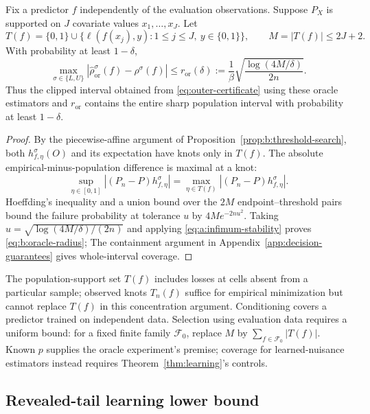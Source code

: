 \begin{proposition}
\label{prop:b:oracle-calibration}
Fix a predictor $f$ independently of the evaluation observations.
Suppose $P_X$ is supported on $J$ covariate values $x_1,\ldots,x_J$.
Let
\[
 T(f)=\{0,1\}\cup\{\ell(f(x_j),y):1\leq j\leq J,
 \ y\in\{0,1\}\},\qquad M=|T(f)|\leq2J+2.
\]
With probability at least $1-\delta$,
\begin{equation}
 \max_{\sigma\in\{L,U\}}
 |\widehat\rho^\sigma_{\mathrm{or}}(f)-\rho^\sigma(f)|
 \leq r_{\mathrm{or}}(\delta):=
 \frac1\beta\sqrt{\frac{\log(4M/\delta)}{2n}}.
 \label{eq:b:oracle-radius}
\end{equation}
Thus the clipped interval obtained from \eqref{eq:outer-certificate}
using these oracle estimators and $r_{\mathrm{or}}$ contains the entire
sharp population interval with probability at least $1-\delta$.
\end{proposition}

\begin{proof}
By the piecewise-affine argument of Proposition~\ref{prop:b:threshold-search},
both $h^\sigma_{f,\eta}(O)$ and its expectation have knots only in $T(f)$.
The absolute empirical-minus-population difference is maximal at a knot:
\[
 \sup_{\eta\in[0,1]}|(P_n-P)h^\sigma_{f,\eta}|
 =\max_{\eta\in T(f)}|(P_n-P)h^\sigma_{f,\eta}|.
\]
Hoeffding's inequality and a union bound over the $2M$ endpoint--threshold
pairs bound the failure probability at tolerance $u$ by $4Me^{-2nu^2}$.
Taking $u=\sqrt{\log(4M/\delta)/(2n)}$ and applying
\eqref{eq:a:infimum-stability} proves \eqref{eq:b:oracle-radius};
The containment argument in Appendix~\ref{app:decision-guarantees} gives
whole-interval coverage.
\end{proof}

The population-support set $T(f)$ includes losses at cells absent from a
particular sample; observed knots $T_n(f)$ suffice for empirical minimization
but cannot replace $T(f)$ in this concentration argument.
Conditioning covers a predictor trained on independent data. Selection using
evaluation data requires a uniform bound: for a fixed finite family
$\mathcal F_0$, replace $M$ by $\sum_{f\in\mathcal F_0}|T(f)|$.
Known $p$ supplies the oracle experiment's premise; coverage for learned-nuisance
estimators instead requires Theorem~\ref{thm:learning}'s controls.

\subsection{Revealed-tail learning lower bound}
\label{app:learning-lower-bound}

